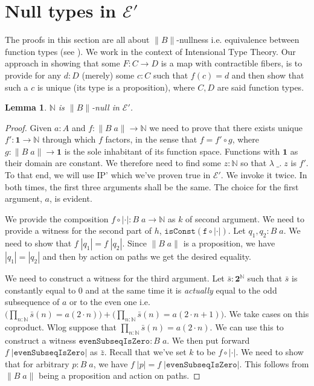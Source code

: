 \documentclass[12pt]{report}
\newtheorem{lem}[thm]{Lemma}
\theoremstyle{definition}
\begin{document}
\section{Null types in $\mathcal{E}'$}\label{SectionNullTypesInE}
The proofs in this section are all about $\lVert B \rVert$-nullness i.e. equivalence between function types (see ). 
We work in the context of Intensional Type Theory. 
Our approach in showing that some $F: C\rightarrow D$ is a map with contractible fibers, is to provide for any $d :D$ (merely) some $c :C$ such that $f(c) = d$ and then show that such a $c$ is unique (its type is a proposition), where $C,D$ are said function types. 
\begin{lem}\label{NisBnull}
$\mathbb{N}$ is $\lVert B \rVert$-null in $\mathcal{E}'$.
\end{lem}
\begin{proof}
Given $a : A$ and $f : \lVert B\; a \rVert \rightarrow \mathbb{N}$ we need to prove that there exists unique $f' : \mathbf{1} \rightarrow \mathbb{N}$ through which $f$ factors, in the sense that $f = f' \circ g$, where $g : \lVert B\; a \rVert \rightarrow \mathbf{1}$ is the sole inhabitant of its function space. 
Functions with $\mathbf{1}$ as their domain are constant. 
We therefore need to find some $z : \mathbb{N}$ so that $\lambda\; \_.\; z$ is $f'$. 
To that end, we will use IP' which we've proven true in $\mathcal{E}'$. 
We invoke it twice. 
In both times, the first three arguments shall be the same. 
The choice for the first argument, $a$, is evident. 

We provide the composition $f \circ |\cdot| : B\; a \rightarrow \mathbb{N}$ as $k$ of second argument. 
We need to provide a witness for the second part of $h$, $\mathtt{isConst(f \circ |\cdot|)}$. 
Let $q_1,q_2 : B\;a$. 
We need to show that $f\;|q_1| = f\; |q_2|$. 
Since $\lVert B\; a\rVert$ is a proposition, we have $|q_1| = |q_2|$ and then by action on paths we get the desired equality.

We need to construct a witness for the third argument. 
Let $\bar{s} : \mathbf{2}^\mathbb{N}$ such that $\bar{s}$ is constantly equal to $0$ and at the same time it is \textit{actually} equal to the odd subsequence of $a$ or to the even one i.e. $\big(\prod_{n : \mathbb{N}} \bar{s}(n) = a(2 \cdot n)\big) + \big(\prod_{n : \mathbb{N}} \bar{s}(n) = a(2\cdot n +1)\big)$. 
We take cases on this coproduct. 
Wlog suppose that $\prod_{n : \mathbb{N}} \bar{s}(n) = a(2 \cdot n)$. 
We can use this to construct a witness $\mathtt{evenSubseqIsZero} : B\;a$. 
We then put forward $f\;|\mathtt{evenSubseqIsZero}|$ as $\bar{z}$. 
Recall that we've set $k$ to be $f\circ |\cdot|$.
We need to show that for arbitrary $p : B\;a $, we have $f\; |p| = f\;|\mathtt{evenSubseqIsZero}|$. 
This follows from $\lVert B\;a\rVert$ being a proposition and action on paths. 


\end{proof}
\end{document}
